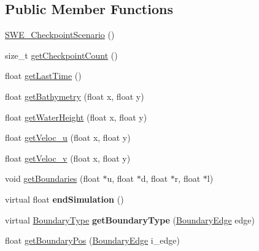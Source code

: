 \subsection*{Public Member Functions}
\begin{DoxyCompactItemize}
\item 
\hyperlink{classSWE__CheckpointScenario_a1d8fef3142657f11a5dbe57ac0dd88c7}{S\-W\-E\-\_\-\-Checkpoint\-Scenario} ()
\item 
size\-\_\-t \hyperlink{classSWE__CheckpointScenario_a4eb6d0fb1e842d3ca9ba8408dd9f3aa2}{get\-Checkpoint\-Count} ()
\item 
float \hyperlink{classSWE__CheckpointScenario_a9b8c9485e5023a75eb6bce03cd15f98c}{get\-Last\-Time} ()
\item 
float \hyperlink{classSWE__CheckpointScenario_a2515a1c9104a225f07737cc9f1e731ad}{get\-Bathymetry} (float x, float y)
\item 
float \hyperlink{classSWE__CheckpointScenario_acd8cae64d2a4098cb3bd68d0a03f286b}{get\-Water\-Height} (float x, float y)
\item 
float \hyperlink{classSWE__CheckpointScenario_a3d04068373de76e97f150d2829b029b5}{get\-Veloc\-\_\-u} (float x, float y)
\item 
float \hyperlink{classSWE__CheckpointScenario_a774a87a27adf6bc855f3ab21d4243ad2}{get\-Veloc\-\_\-v} (float x, float y)
\item 
void \hyperlink{classSWE__CheckpointScenario_a49face4d71e960656d78b5525318bbd1}{get\-Boundaries} (float $\ast$u, float $\ast$d, float $\ast$r, float $\ast$l)
\item 
\hypertarget{classSWE__CheckpointScenario_ad8903d3a88c515a8fd720299adae5097}{virtual float {\bfseries end\-Simulation} ()}\label{classSWE__CheckpointScenario_ad8903d3a88c515a8fd720299adae5097}

\item 
\hypertarget{classSWE__CheckpointScenario_acfc8c2cccbdd62e605d092678456250f}{virtual \hyperlink{SWE__Scenario_8hh_af75d5dd7322fa39ed0af4e7839e600f8}{Boundary\-Type} {\bfseries get\-Boundary\-Type} (\hyperlink{SWE__Scenario_8hh_aa5e01e3f7df312f7b9b0d02521141fcc}{Boundary\-Edge} edge)}\label{classSWE__CheckpointScenario_acfc8c2cccbdd62e605d092678456250f}

\item 
float \hyperlink{classSWE__CheckpointScenario_a1efa5054f7699258076ca843c30a18fb}{get\-Boundary\-Pos} (\hyperlink{SWE__Scenario_8hh_aa5e01e3f7df312f7b9b0d02521141fcc}{Boundary\-Edge} i\-\_\-edge)
\end{DoxyCompactItemize}
